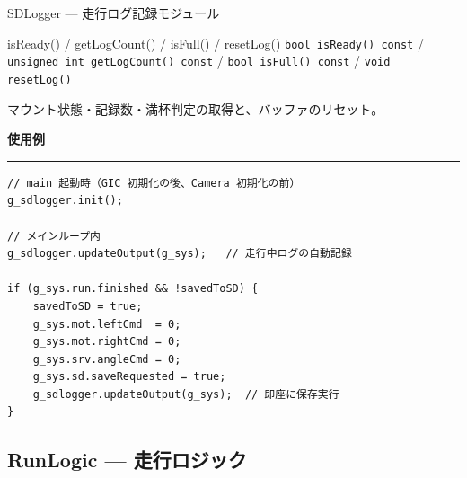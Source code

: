 \documentclass[a4paper,11pt,dvipdfmx]{jsarticle}
\makeatletter
\newcommand{\apisection}[1]{%
  \par\addvspace{4mm}%
  {\normalsize\bfseries\color{headerblue} #1}%
  \par\vspace{-1mm}%
  {\color{accentblue!40}\rule{\linewidth}{0.5pt}}%
  \par\nobreak\vspace{2mm}%
  \@afterheading
}
\makeatother
\begin{document}
\begin{apibox}{SDLogger --- 走行ログ記録モジュール}
\begin{funcblock}{isReady() / getLogCount() / isFull() / resetLog()}
\texttt{bool isReady() const} / \texttt{unsigned int getLogCount() const} /
\texttt{bool isFull() const} / \texttt{void resetLog()}

\vspace{1.5mm}
マウント状態・記録数・満杯判定の取得と、バッファのリセット。
\end{funcblock}

\apisection{使用例}

\begin{lstlisting}[caption={SDLogger の組み込み例（メインループ）},label=lst:sdlogger]
// main 起動時（GIC 初期化の後、Camera 初期化の前）
g_sdlogger.init();

// メインループ内
g_sdlogger.updateOutput(g_sys);   // 走行中ログの自動記録

if (g_sys.run.finished && !savedToSD) {
    savedToSD = true;
    g_sys.mot.leftCmd  = 0;
    g_sys.mot.rightCmd = 0;
    g_sys.srv.angleCmd = 0;
    g_sys.sd.saveRequested = true;
    g_sdlogger.updateOutput(g_sys);  // 即座に保存実行
}
\end{lstlisting}

\end{apibox}

\subsection{RunLogic --- 走行ロジック}\label{sec:api-runlogic}
\end{document}
